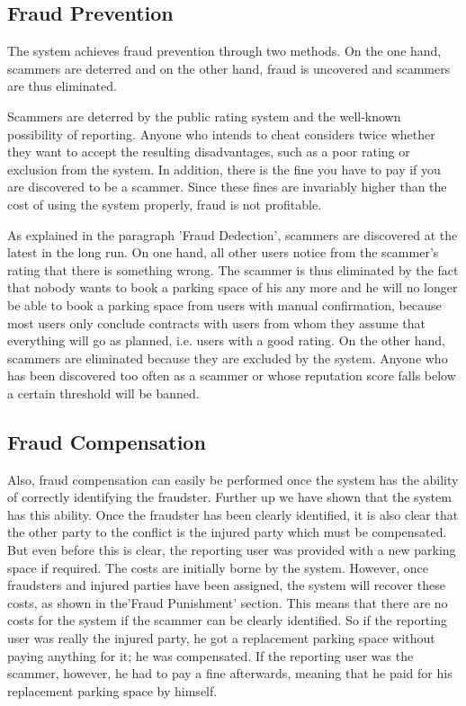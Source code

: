 \documentclass[
a4paper,     %
titlepage,   %
14pt         %
]{scrartcl}  %
\theoremstyle{mystyle}
\begin{document}
\subsection{Fraud Prevention}
The system achieves fraud prevention through two methods. On the one hand, scammers are deterred and on the other hand, fraud is uncovered and scammers are thus eliminated.

Scammers are deterred by the public rating system and the well-known possibility of reporting. Anyone who intends to cheat considers twice whether they want to accept the resulting disadvantages, such as a poor rating or exclusion from the system. In addition, there is the fine you have to pay if you are discovered to be a scammer. Since these fines are invariably higher than the cost of using the system properly, fraud is not profitable.

As explained in the paragraph 'Fraud Dedection', scammers are discovered at the latest in the long run. On one hand, all other users notice from the scammer's rating that there is something wrong. The scammer is thus eliminated by the fact that nobody wants to book a parking space of his any more and he will no longer be able to book a parking space from users with manual confirmation, because most users only conclude contracts with users from whom they assume that everything will go as planned, i.e. users with a good rating. On the other hand, scammers are eliminated because they are excluded by the system. Anyone who has been discovered too often as a scammer or whose reputation score falls below a certain threshold will be banned.

\subsection{Fraud Compensation}
Also, fraud compensation can easily be performed once the system has the ability of correctly identifying the fraudster. Further up we have shown that the system has this ability. Once the fraudster has been clearly identified, it is also clear that the other party to the conflict is the injured party which must be compensated. \\

But even before this is clear, the reporting user was provided with a new parking space if required. The costs are initially borne by the system. However, once fraudsters and injured parties have been assigned, the system will recover these costs, as shown in the'Fraud Punishment' section. This means that there are no costs for the system if the scammer can be clearly identified. So if the reporting user was really the injured party, he got a replacement parking space without paying anything for it; he was compensated. If the reporting user was the scammer, however, he had to pay a fine afterwards, meaning that he paid for his replacement parking space by himself.
\end{document}
